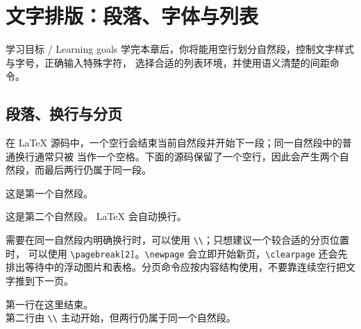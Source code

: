 %
\section{文字排版：段落、字体与列表}

\begin{learningbox}{学习目标 / Learning goals}
学完本章后，你将能用空行划分自然段，控制文字样式与字号，正确输入特殊字符，
选择合适的列表环境，并使用语义清楚的间距命令。
\end{learningbox}

\subsection{段落、换行与分页}

在 LaTeX 源码中，一个空行会结束当前自然段并开始下一段；同一自然段中的普通换行通常只被
当作一个空格。下面的源码保留了一个空行，因此会产生两个自然段，而最后两行仍属于同一段。

\begin{codeblock}
这是第一个自然段。

这是第二个自然段。
LaTeX 会自动换行。
\end{codeblock}

需要在同一自然段内明确换行时，可以使用 \verb|\\|；只想建议一个较合适的分页位置时，
可以使用 \verb|\pagebreak[2]|。\verb|\newpage| 会立即开始新页，\verb|\clearpage|
还会先排出等待中的浮动图片和表格。分页命令应按内容结构使用，不要靠连续空行把文字推到下一页。

\begin{resultbox}
第一行在这里结束。\\
第二行由 \verb|\\| 主动开始，但两行仍属于同一个自然段。
\end{resultbox}

